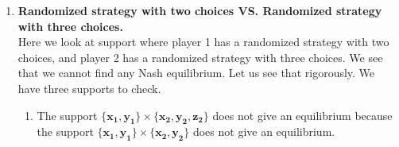 \begin{enumerate} [label=\Alph*. ]
\begin{enumerate} [label*= (\arabic*)]
    \item $\mathbf{\{x_1, z_1\}} \times \mathbf{\{y_2, z_2\}}$. \\
    We define $\sigma_{2} \parent{y_2} = \beta$ and $\sigma_{1} \parent{z_1} = 1 - \beta$. In Step 2, for player 1, we have
    \begin{equation*}
        w_1 = \sum_{c_2 \in \bracket{y_2, z_2}} \sigma_{2} \parent{c_2} \cdot u_1 \parent{c_2, d_1} \ \forall \ d_1 \in \bracket{x_1, z_1}.
    \end{equation*}
    Hence we must have $w_1 = 5 \cdot \beta + 4 \cdot \parent{1 - \beta} = 4 \cdot \beta + 0 \cdot \parent{1 - \beta}$, or again, $\beta = \frac{4}{3}$. It is absurd to have a probability strictly greater than one, hence this support does not yield an equilibrium.
    
    \vspace{3mm}
    
    
    
    \item[] Now we can use the symmetry of the problem.
    
    \item The support $\mathbf{\{x_1, y_1\}} \times \mathbf{\{x_2, z_2\}}$ does not give an equilibrium, therefore the support $\mathbf{\{x_1, z_1\}} \times \mathbf{\{x_2, y_2\}}$ will not give an equilibrium either.
    
    \item The support $\mathbf{\{x_1, y_1\}} \times \mathbf{\{y_2, z_2\}}$ does not give an equilibrium, therefore the support $\mathbf{\{y_1, z_1\}} \times \mathbf{\{x_2, y_2\}}$ will not give an equilibrium either.
    
    \item The support $\mathbf{\{x_1, z_1\}} \times \mathbf{\{y_2, z_2\}}$ does not give an equilibrium, therefore the support $\mathbf{\{y_1, z_1\}} \times \mathbf{\{x_2, z_2\}}$ will not give an equilibrium either.
        
\end{enumerate}

\item \textbf{Randomized strategy with two choices VS. Randomized strategy with three choices.} \\
Here we look at support where player 1 has a randomized strategy with two choices, and player 2 has a randomized strategy with three choices. We see that we cannot find any Nash equilibrium. Let us see that rigorously. We have three supports to check.
\begin{enumerate} [label*= (\arabic*)]
    \item The support $\mathbf{\{x_1, y_1\}} \times \mathbf{\{x_2, y_2, z_2\}}$ does not give an equilibrium because the support $\mathbf{\{x_1, y_1\}} \times \mathbf{\{x_2, y_2\}}$ does not give an equilibrium.
    

\end{enumerate}
\end{enumerate}
